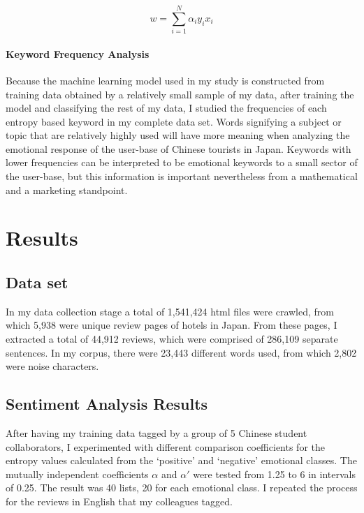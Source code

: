 \documentclass[review]{elsarticle}
\newcommand{\myparagraph}[1]{\paragraph{#1}\mbox{}\smallskip}
\begin{document}
\begin{equation}\label{eq:svm_weight}
w = \sum_{i=1}^N \alpha_i y_i x_i
\end{equation}

\myparagraph{Keyword Frequency Analysis}\label{keywordfrequencyanalysis}

Because the machine learning model used in my study is constructed from training data obtained by a relatively small sample of my data, after training the model and classifying the rest of my data, I studied the frequencies of each entropy based keyword in my complete data set. Words signifying a subject or topic that are relatively highly used will have more meaning when analyzing the emotional response of the user-base of Chinese tourists in Japan. Keywords with lower frequencies can be interpreted to be emotional keywords to a small sector of the user-base, but this information is important nevertheless from a mathematical and a marketing standpoint.

\section{Results}\label{results}

\subsection{Data set}\label{dataset}

In my data collection stage a total of 1,541,424 html files were crawled, from which 5,938 were unique review pages of hotels in Japan. From these pages, I extracted a total of 44,912 reviews, which were comprised of 286,109 separate sentences. In my corpus, there were 23,443 different words used, from which 2,802 were noise characters.

\subsection{Sentiment Analysis Results}\label{sentimentresults}

After having my training data tagged by a group of 5 Chinese student collaborators, I experimented with different comparison coefficients for the entropy values calculated from the ‘positive’ and ‘negative’ emotional classes. The mutually independent coefficients \(\alpha\) and \(\alpha'\) were tested from 1.25 to 6 in intervals of 0.25. The result was 40 lists, 20 for each emotional class. I repeated the process for the reviews in English that my colleagues tagged.
\end{document}
